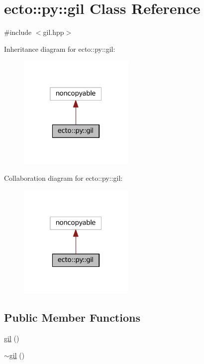 \hypertarget{classecto_1_1py_1_1gil}{}\section{ecto\+:\+:py\+:\+:gil Class Reference}
\label{classecto_1_1py_1_1gil}


{\ttfamily \#include $<$gil.\+hpp$>$}



Inheritance diagram for ecto\+:\+:py\+:\+:gil\+:\nopagebreak
\begin{figure}[H]
\begin{center}
\leavevmode
\includegraphics[width=157pt]{classecto_1_1py_1_1gil__inherit__graph}
\end{center}
\end{figure}


Collaboration diagram for ecto\+:\+:py\+:\+:gil\+:\nopagebreak
\begin{figure}[H]
\begin{center}
\leavevmode
\includegraphics[width=157pt]{classecto_1_1py_1_1gil__coll__graph}
\end{center}
\end{figure}
\subsection*{Public Member Functions}
\begin{DoxyCompactItemize}
\item 
\hyperlink{classecto_1_1py_1_1gil_aad7e0cb610b4766dbdfa918227e806cc}{gil} ()
\item 
\hyperlink{classecto_1_1py_1_1gil_a18685c76c39837ddf90159fb0721ab62}{$\sim$gil} ()
\end{DoxyCompactItemize}
